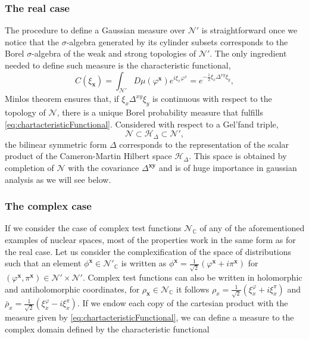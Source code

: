 \documentclass[12pt]{article}%
\begin{document}
\subsubsection{The real case}
The procedure to define a Gaussian measure over $\mathcal{N}'$ is straightforward once we notice that the $\sigma$-algebra generated by its cylinder subsets corresponds to the Borel $\sigma$-algebra of the weak and strong topologies of $\mathcal{N}'$.  The only ingredient needed to define such measure is the characteristic functional,
\begin{equation}
    \label{eq:chartacteristicFunctional}
        C(\xi_{\mathbf{x}})=\int_{\mathcal{N}'}D\mu(\varphi^{\mathbf{x}}) e^{i\xi_x\varphi^x} =e^{-\frac{1}{2}{\xi}_x\Delta^{xy}\xi_y},
\end{equation}
 Minlos theorem \cite{Gellfand,Hida1993} ensures that, if ${\xi}_x\Delta^{xy}\xi_y$ is continuous with respect to the topology of $\mathcal{N}$, there is a unique Borel probability measure that fulfills \eqref{eq:chartacteristicFunctional}. Considered with respect to a Gel'fand triple,
$$
\mathcal{N}\subset \mathcal{H}_\Delta \subset \mathcal{N}',
$$
the bilinear symmetric form $\Delta$ corresponds to the representation of the scalar product of the Cameron-Martin Hilbert space $\mathcal{H}_\Delta$. This space is obtained by completion of $\mathcal{N}$ with the covariance $\Delta^{\mathbf{xy}}$ and is of huge importance in gaussian analysis as we will see below. 


\subsubsection{The complex case}
If we consider the case of complex test functions $\mathcal{N}_\mathbb{C}$ of any of the aforementioned examples of nuclear spaces, most of the properties work in the same form as for the real case.  Let us consider the complexification of the space of distributions such that  an element $\phi^{\mathbf{x}}\in\mathcal{N}'_\mathbb{C}$ is written as $\phi^{\mathbf{x}}=\frac{1}{\sqrt{2}}(\varphi^{\mathbf{x}}+i\pi^{\mathbf{x}})$ for $(\varphi^{\mathbf{x}},\pi^\mathbf{x})\in \mathcal{N}'\times \mathcal{N}'$. Complex test functions can also be written in holomorphic and antiholomorphic  coordinates, for $\rho_{\mathbf{x}}\in\mathcal{N}_\mathbb{C}$ it follows  $\rho_x=\frac{1}{\sqrt{2}}(\xi^{\varphi}_x+i\xi^{\pi}_x)$ and $\bar\rho_x=\frac{1}{\sqrt{2}}(\xi^{\varphi}_x-i\xi^{\pi}_x)$. If we endow each copy of the cartesian product with the measure given by \eqref{eq:chartacteristicFunctional},  we can define a measure to the complex domain  defined by the characteristic functional  
\end{document}
